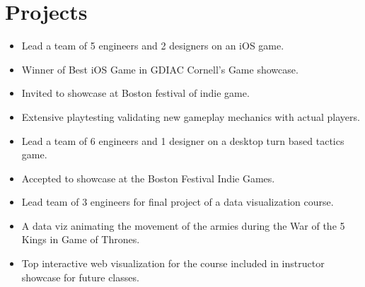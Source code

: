 \documentclass[10pt,letterpaper,sans]{moderncv}        %
\begin{document}
\section{Projects}
\begin{itemize}%
\item Lead a team of 5 engineers and 2 designers on an iOS game.
\item Winner of Best iOS Game in GDIAC Cornell’s Game showcase.
\item Invited to showcase at Boston festival of indie game.
\item Extensive playtesting validating new gameplay mechanics with actual players.
\end{itemize}
\begin{itemize}
\item Lead a team of 6 engineers and 1 designer on a desktop turn based tactics game.
\item Accepted to showcase at the Boston Festival Indie Games.
\end{itemize}
\begin{itemize}
\item Lead team of 3 engineers for final project of a data visualization course.
\item A data viz animating the movement of the armies during the War of the 5 Kings in Game of Thrones.
\item Top interactive web visualization for the course included in instructor showcase for future classes.
\end{itemize}



\end{document}
